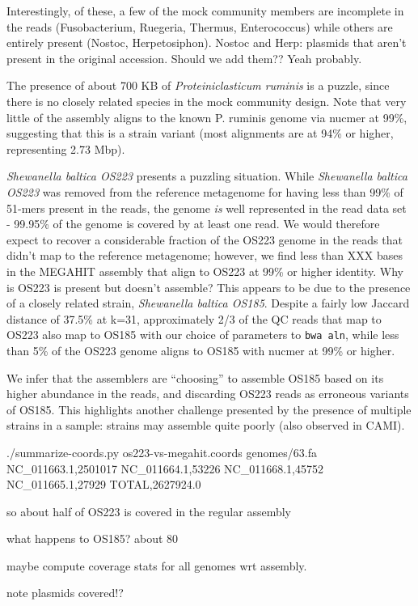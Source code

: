\documentclass[10pt,a4paper,twocolumn]{article}
\begin{document}
Interestingly, of these, a few of the mock community members are
incomplete in the reads (Fusobacterium, Ruegeria, Thermus,
Enterococcus) while others are entirely present (Nostoc,
Herpetosiphon).  Nostoc and Herp: plasmids that aren't present in the
original accession. Should we add them?? Yeah probably.

The presence of about 700 KB of {\em Proteiniclasticum ruminis} is a puzzle,
since there is no closely related species in the mock community design.
Note that very little of the assembly aligns to the known P. ruminis
genome via nucmer at 99\%, suggesting that this is a strain variant
(most alignments are at 94\% or higher, representing 2.73 Mbp).

{\em Shewanella baltica OS223} presents a puzzling situation.  While
{\em Shewanella baltica OS223} was removed from the reference
metagenome for having less than 99\% of 51-mers present in the reads,
the genome {\em is} well represented in the read data set - 99.95\% of
the genome is covered by at least one read.  We would therefore expect
to recover a considerable fraction of the OS223 genome in the reads
that didn't map to the reference metagenome; however, we find less
than XXX bases in the MEGAHIT assembly that align to OS223 at 99\% or
higher identity.  Why is OS223 is present but doesn't assemble?  This
appears to be due to the presence of a closely related strain, {\em
  Shewanella baltica OS185}.  Despite a fairly low Jaccard distance of
37.5\% at k=31, approximately 2/3 of the QC reads that map to OS223
also map to OS185 with our choice of parameters to {\tt bwa aln},
while less than 5\% of the OS223 genome aligns to OS185 with nucmer
at 99\% or higher.

We infer that the assemblers are ``choosing'' to assemble OS185 based
on its higher abundance in the reads, and discarding OS223 reads as
erroneous variants of OS185.  This highlights another
challenge presented by the presence of multiple strains in a sample:
strains may assemble quite poorly (also observed in CAMI).

./summarize-coords.py os223-vs-megahit.coords genomes/63.fa
NC_011663.1,2501017
NC_011664.1,53226
NC_011668.1,45752
NC_011665.1,27929
TOTAL,2627924.0

so about half of OS223 is covered in the regular assembly

what happens to OS185? about 80%

maybe compute coverage stats for all genomes wrt assembly.

note plasmids covered!?
\end{document}
